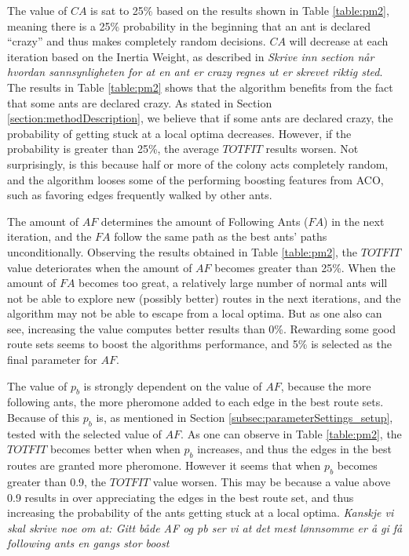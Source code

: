 The value of $CA$ is sat to 25\% based on the results shown in Table \ref{table:pm2}, meaning there is a 25\% probability in the beginning that an ant is declared ``crazy'' and thus makes completely random decisions. $CA$ will decrease at each iteration based on the Inertia Weight, as described in \emph{\color{blue} Skrive inn section når hvordan sannsynligheten for at en ant er crazy regnes ut er skrevet riktig sted}. The results in Table \vref{table:pm2} shows that the algorithm benefits from the fact that some ants are declared crazy. As stated in Section \vref{section:methodDescription}, we believe that if some ants are declared crazy, the probability of getting stuck at a local optima decreases. However, if the probability is greater than 25\%, the average $TOTFIT$ results worsen. Not surprisingly, is this because half or more of the colony acts completely random, and the algorithm looses some of the performing boosting features from ACO, such as favoring edges frequently walked by other ants. 
\newline

The amount of $AF$ determines the amount of Following Ants ($FA$) in the next iteration, and the $FA$ follow the same path as the best ants' paths unconditionally. Observing the results obtained in Table \vref{table:pm2}, the $TOTFIT$ value deteriorates when the amount of $AF$ becomes greater than 25\%. When the amount of $FA$ becomes too great, a relatively large number of normal ants will not be able to explore new (possibly better) routes in the next iterations, and the algorithm may not be able to escape from a local optima. But as one also can see,  increasing the value computes better results than 0\%. Rewarding some good route sets seems to boost the algorithms performance, and 5\% is selected as the final parameter for $AF$. 

The value of $p_b$ is strongly dependent on the value of $AF$, because the more following ants, the more pheromone added to each edge in the best route sets. Because of this $p_b$ is, as mentioned in Section \vref{subsec:parameterSettings_setup}, tested with the selected value of $AF$. As one can observe in Table \vref{table:pm2}, the $TOTFIT$ becomes better when when $p_b$ increases, and thus the edges in the best routes are granted more pheromone. However it seems that when $p_b$ becomes greater than 0.9, the $TOTFIT$ value worsen. This may be because a value above 0.9 results in over appreciating the edges in the best route set, and thus increasing the probability of the ants getting stuck at a local optima. \emph{\color{blue} Kanskje vi skal skrive noe om at: Gitt både AF og pb ser vi at det mest lønnsomme er å gi få following ants en gangs stor boost}


